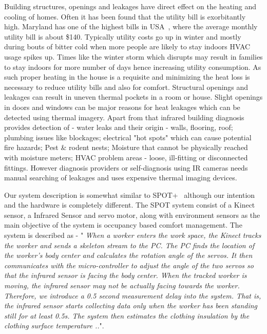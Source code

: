 \documentclass{sig-alternate}
\begin{document}
 \indent Building structures, openings and leakages have direct effect on the heating and cooling of homes. Often it has been found that the utility bill is exorbitantly high. Maryland has one of the highest bills in USA~\cite{EIA2014}, where the average monthly utility bill is about \$140. Typically utility costs go up in winter and mostly during bouts of bitter cold when more people are likely to stay indoors HVAC usage spikes up. Times like the winter storm which disrupts may result in families to stay indoors for more number of days hence increasing utility consumption. As such proper heating in the house is a requisite and minimizing the heat loss is necessary to reduce utility bills and also for comfort. Structural openings and leakages can result in uneven thermal pockets in a room or house. Slight openings in doors and windows can be major reasons for heat leakages which can be detected using thermal imagery. Apart from that infrared building diagnosis provides detection of - water leaks and their origin - walls, flooring, roof; plumbing issues like blockages; electrical "hot spots" which can cause potential fire hazards; Pest \& rodent nests; Moisture that cannot be physically reached with moisture meters; HVAC problem areas - loose, ill-fitting or disconnected fittings. However diagnosis providers or self-diagnosis using IR cameras needs manual searching of leakages and uses expensive thermal imaging devices.

 \indent Our system description is somewhat similar to SPOT+~\cite{SPOT,SPOT+} although our intention and the hardware is completely different. The SPOT system consist of a Kinect sensor, a Infrared Sensor and servo motor, along with environment sensors as the main objective of the system is occupancy based comfort management. The system is described as - "\textit{ When a worker enters the work space, the Kinect tracks the worker and sends a skeleton stream to the PC. The PC finds the location of the worker's body center and calculates the rotation angle of the servos. It then communicates with the micro-controller to adjust the angle of the two servos so that the infrared sensor is facing the body center. When the tracked worker is moving, the infrared sensor may not be actually facing towards the worker. Therefore, we introduce a 0.5 second measurement delay into the system. That is, the infrared sensor starts collecting data only when the worker has been standing still for at least 0.5s. The system then estimates the clothing insulation by the clothing surface temperature ..}".
\end{document}
